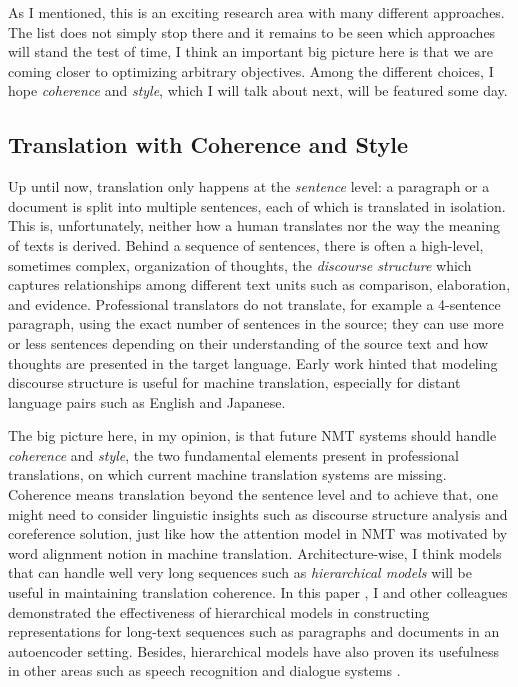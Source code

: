 As I mentioned, this is an exciting research area with many different approaches. The list does not simply stop there and it remains to be seen which approaches will stand the test of time, I think an important big picture here is that we are coming closer to optimizing arbitrary objectives. Among the different choices, I hope {\it coherence} and {\it style}, which I will talk about next, will be featured some day.

\subsection{Translation with Coherence and Style}
Up until now, translation only happens at the {\it sentence} level: a paragraph or a document is split into multiple sentences, each of which is translated in isolation. This is, unfortunately, neither how a human translates nor the way the meaning of texts is derived. Behind a sequence of sentences, there is often a high-level, sometimes complex, organization of thoughts, the {\it discourse structure} \cite{mann1988} which captures relationships among different text units such as comparison, elaboration, and evidence. Professional translators do not translate, for example a 4-sentence paragraph, using the exact number of sentences in the source; they can use more or less sentences depending on their understanding of the source text and how thoughts are presented in the target language. Early work \cite{marcu2000} hinted that modeling discourse structure is useful for machine translation, especially for distant language pairs such as English and Japanese.

The big picture here, in my opinion, is that future NMT systems should handle {\it coherence} and {\it style}, the two fundamental elements present in professional translations, on which current machine translation systems are missing. Coherence means translation beyond the sentence level and to achieve that, one might need to consider linguistic insights such as discourse structure analysis and coreference solution, just like how the attention model in NMT was motivated by word alignment notion in machine translation. 
Architecture-wise, I think models that can handle well very long sequences such as {\it hierarchical models} will be useful in maintaining translation coherence. In this paper \cite{li15}, I and other colleagues demonstrated the effectiveness of hierarchical models in constructing representations for long-text sequences such as paragraphs and documents in an autoencoder setting.
Besides, hierarchical models have also proven its usefulness in other areas such as speech recognition \cite{chan16} and dialogue systems \cite{serban16}.

